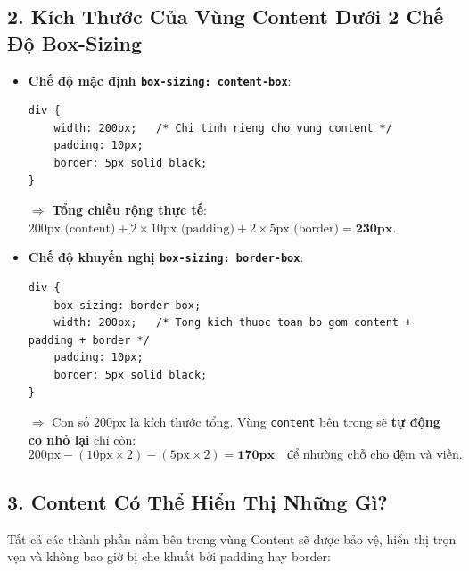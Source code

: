 \documentclass[11pt,oneside]{book}
\newcommand{\codeinline}[1]{\textcolor{accentOrange}{\texttt{#1}}}
\begin{document}
\subsection{2. Kích Thước Của Vùng Content Dưới 2 Chế Độ Box-Sizing}

\begin{itemize}[leftmargin=1.5em, itemsep=4pt, parsep=0pt]
    \item \textbf{Chế độ mặc định \codeinline{box-sizing: content-box}}:
    \begin{codeWindow}
\begin{lstlisting}[language=CSS3]
div {
    width: 200px;   /* Chi tinh rieng cho vung content */
    padding: 10px;
    border: 5px solid black;
}
\end{lstlisting}
    \end{codeWindow}
    $\Longrightarrow$ \textbf{Tổng chiều rộng thực tế}: $200\text{px (content)} + 2 \times 10\text{px (padding)} + 2 \times 5\text{px (border)} = \mathbf{230\text{px}}$.

    \item \textbf{Chế độ khuyến nghị \codeinline{box-sizing: border-box}}:
    \begin{codeWindow}
\begin{lstlisting}[language=CSS3]
div {
    box-sizing: border-box;
    width: 200px;   /* Tong kich thuoc toan bo gom content + padding + border */
    padding: 10px;
    border: 5px solid black;
}
\end{lstlisting}
    \end{codeWindow}
    $\Longrightarrow$ Con số $200\text{px}$ là kích thước tổng. Vùng \codeinline{content} bên trong sẽ \textbf{tự động co nhỏ lại} chỉ còn:
    \[
    200\text{px} - (10\text{px} \times 2) - (5\text{px} \times 2) = \mathbf{170\text{px}} \quad \text{để nhường chỗ cho đệm và viền.}
    \]
\end{itemize}

\subsection{3. Content Có Thể Hiển Thị Những Gì?}

Tất cả các thành phần nằm bên trong vùng Content sẽ được bảo vệ, hiển thị trọn vẹn và không bao giờ bị che khuất bởi padding hay border:
\end{document}
